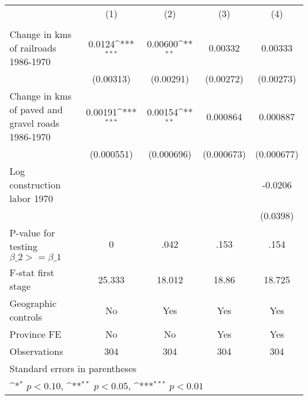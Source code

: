{
\def\sym#1{\ifmmode^{#1}\else\(^{#1}\)\fi}
\begin{tabular}{l*{4}{c}}
\hline\hline
                &\multicolumn{1}{c}{(1)}&\multicolumn{1}{c}{(2)}&\multicolumn{1}{c}{(3)}&\multicolumn{1}{c}{(4)}\\
                &\multicolumn{1}{c}{}&\multicolumn{1}{c}{}&\multicolumn{1}{c}{}&\multicolumn{1}{c}{}\\
\hline
Change in kms of railroads 1986-1970&   0.0124\sym{***}&  0.00600\sym{**} &  0.00332         &  0.00333         \\
                &(0.00313)         &(0.00291)         &(0.00272)         &(0.00273)         \\
[1em]
Change in kms of paved and gravel roads 1986-1970&  0.00191\sym{***}&  0.00154\sym{**} & 0.000864         & 0.000887         \\
                &(0.000551)         &(0.000696)         &(0.000673)         &(0.000677)         \\
[1em]
Log construction labor 1970&                  &                  &                  &  -0.0206         \\
                &                  &                  &                  & (0.0398)         \\
\hline
P-value for testing $\beta\_{2} >= \beta\_{1}$&        0         &     .042         &     .153         &     .154         \\
F-stat first stage&   25.333         &   18.012         &    18.86         &   18.725         \\
Geographic controls&       No         &      Yes         &      Yes         &      Yes         \\
Province FE     &       No         &       No         &      Yes         &      Yes         \\
Observations    &      304         &      304         &      304         &      304         \\
\hline\hline
\multicolumn{5}{l}{\footnotesize Standard errors in parentheses}\\
\multicolumn{5}{l}{\footnotesize \sym{*} \(p<0.10\), \sym{**} \(p<0.05\), \sym{***} \(p<0.01\)}\\
\end{tabular}
}
